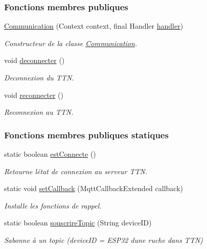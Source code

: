 \subsubsection*{Fonctions membres publiques}
\begin{DoxyCompactItemize}
\item 
\hyperlink{classcom_1_1example_1_1bee__honeyt_1_1_communication_a1f92cddc3a6b011683d0ed8d1371227d}{Communication} (Context context, final Handler \hyperlink{classcom_1_1example_1_1bee__honeyt_1_1_communication_add1a0705dba503c1c4c7a3168a571b20}{handler})
\begin{DoxyCompactList}\small\item\em Constructeur de la classe \hyperlink{classcom_1_1example_1_1bee__honeyt_1_1_communication}{Communication}. \end{DoxyCompactList}\item 
void \hyperlink{classcom_1_1example_1_1bee__honeyt_1_1_communication_a55454851f5e883b1539bd60fa7f4bfc6}{deconnecter} ()
\begin{DoxyCompactList}\small\item\em Deconnexion du T\+TN. \end{DoxyCompactList}\item 
void \hyperlink{classcom_1_1example_1_1bee__honeyt_1_1_communication_ae0851e23e515c71cfa06cf635c731c07}{reconnecter} ()
\begin{DoxyCompactList}\small\item\em Reconnexion au T\+TN. \end{DoxyCompactList}\end{DoxyCompactItemize}
\subsubsection*{Fonctions membres publiques statiques}
\begin{DoxyCompactItemize}
\item 
static boolean \hyperlink{classcom_1_1example_1_1bee__honeyt_1_1_communication_a155e0619c3d504750871a84e637bb808}{est\+Connecte} ()
\begin{DoxyCompactList}\small\item\em Retourne l\textquotesingle{}état de connexion au serveur T\+TN. \end{DoxyCompactList}\item 
static void \hyperlink{classcom_1_1example_1_1bee__honeyt_1_1_communication_a86faf903d7d230a0105b29e5c1d5f4a2}{set\+Callback} (Mqtt\+Callback\+Extended callback)
\begin{DoxyCompactList}\small\item\em Installe les fonctions de rappel. \end{DoxyCompactList}\item 
static boolean \hyperlink{classcom_1_1example_1_1bee__honeyt_1_1_communication_aa1093a3d4f3479595a36ef2425f3ef70}{souscrire\+Topic} (String device\+ID)
\begin{DoxyCompactList}\small\item\em S\textquotesingle{}abonne à un topic (device\+ID = E\+S\+P32 d\textquotesingle{}une ruche dans T\+TN) \end{DoxyCompactList}\end{DoxyCompactItemize}
